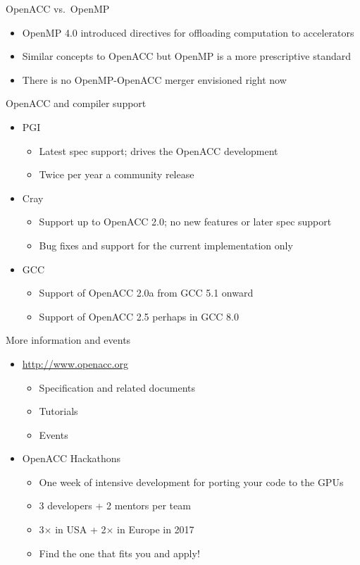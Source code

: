 \documentclass[12pt,aspectratio=169]{beamer}
\begin{document}
\begin{frame}{OpenACC vs.\ OpenMP}
  \begin{itemize}
  \item OpenMP 4.0 introduced directives for offloading computation to accelerators
  \item Similar concepts to OpenACC but OpenMP is a more prescriptive standard
  \item There is no OpenMP-OpenACC merger envisioned right now
  \end{itemize}

  \vfill
  OpenACC and compiler support
  \begin{itemize}
  \item PGI
    \begin{itemize}
    \item Latest spec support; drives the OpenACC development
    \item Twice per year a community release
    \end{itemize}
  \item Cray
    \begin{itemize}
    \item Support up to OpenACC 2.0; no new features or later spec support
    \item Bug fixes and support for the current implementation only
    \end{itemize}
  \item GCC
    \begin{itemize}
    \item Support of OpenACC 2.0a from GCC 5.1 onward
    \item Support of OpenACC 2.5 perhaps in GCC 8.0
    \end{itemize}
  \end{itemize}
\end{frame}

\begin{frame}{More information and events}
  \begin{itemize}
  \item \url{http://www.openacc.org}
    \begin{itemize}
    \item Specification and related documents
    \item Tutorials
    \item Events
    \end{itemize}
    \vfill
  \item OpenACC Hackathons
    \begin{itemize}
    \item One week of intensive development for porting your code to the GPUs
    \item 3 developers + 2 mentors per team
    \item 3$\times$ in USA + 2$\times$ in Europe in 2017
    \item Find the one that fits you and apply!
    \end{itemize}
  \end{itemize}
\end{frame}
\end{document}
